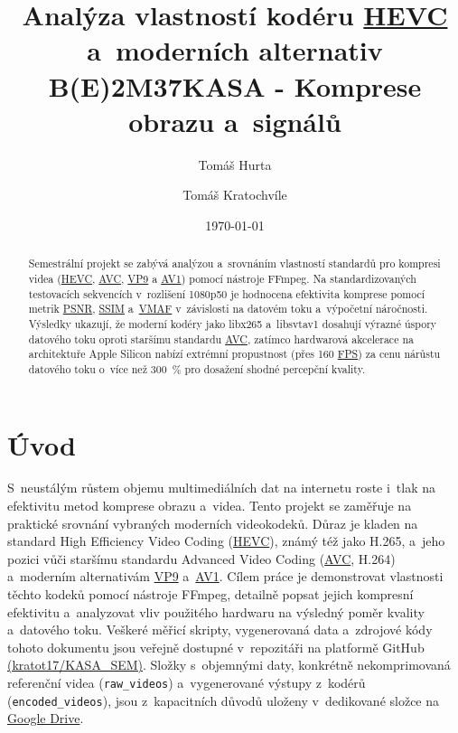 \documentclass[11pt,a4paper]{article}
\title{Analýza vlastností kodéru \hyperref[sec:standards]{HEVC} a~moderních alternativ\\
\large B(E)2M37KASA - Komprese obrazu a~signálů}
\author{Tomáš Hurta \and Tomáš Kratochvíle}
\date{\today}
\begin{document}
\maketitle

\begin{abstract}
Semestrální projekt se zabývá analýzou a~srovnáním vlastností standardů pro kompresi videa (\hyperref[sec:standards]{HEVC}, \hyperref[sec:standards]{AVC}, \hyperref[sec:standards]{VP9} a \hyperref[sec:standards]{AV1}) pomocí nástroje FFmpeg. Na standardizovaných testovacích sekvencích v~rozlišení 1080p50 je hodnocena efektivita komprese pomocí metrik \hyperref[sec:metrics]{PSNR}, \hyperref[sec:metrics]{SSIM} a~\hyperref[sec:metrics]{VMAF} v~závislosti na datovém toku a~výpočetní náročnosti. Výsledky ukazují, že moderní kodéry jako libx265 a~libsvtav1 dosahují výrazné úspory datového toku oproti staršímu standardu \hyperref[sec:standards]{AVC}, zatímco hardwarová akcelerace na architektuře Apple Silicon nabízí extrémní propustnost (přes 160 \hyperref[sec:derived_metrics]{FPS}) za cenu nárůstu datového toku o~více než 300\ \% pro dosažení shodné percepční kvality.
\end{abstract}

\tableofcontents
\newpage

\section{Úvod}
S~neustálým růstem objemu multimediálních dat na internetu roste i~tlak na efektivitu metod komprese obrazu a~videa. Tento projekt se zaměřuje na praktické srovnání vybraných moderních videokodeků. Důraz je kladen na standard High Efficiency Video Coding (\hyperref[sec:standards]{HEVC}), známý též jako H.265, a~jeho pozici vůči staršímu standardu Advanced Video Coding (\hyperref[sec:standards]{AVC}, H.264) a~moderním alternativám \hyperref[sec:standards]{VP9} a~\hyperref[sec:standards]{AV1}. Cílem práce je demonstrovat vlastnosti těchto kodeků pomocí nástroje FFmpeg, detailně popsat jejich kompresní efektivitu a~analyzovat vliv použitého hardwaru na výsledný poměr kvality a~datového toku. Veškeré měřicí skripty, vygenerovaná data a~zdrojové kódy tohoto dokumentu jsou veřejně dostupné v~repozitáři na platformě GitHub \href{https://github.com/kratot17/KASA_SEM}{(kratot17/KASA\_SEM)}. Složky s~objemnými daty, konkrétně nekomprimovaná referenční videa (\texttt{raw\_videos}) a~vygenerované výstupy z~kodérů (\texttt{encoded\_videos}), jsou z~kapacitních důvodů uloženy v~dedikované složce na \href{https://drive.google.com/drive/folders/1dQosNQVMNARsGfBLjNj08zZU0Cm_nrx5?usp=sharing}{Google Drive}.
\end{document}
